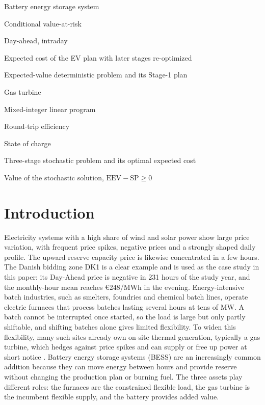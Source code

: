 \documentclass[5p,times,twocolumn]{elsarticle}
\newenvironment{nomlist}{%
  \begingroup\footnotesize
  \list{}{%
    \setlength{\labelwidth}{0.27\columnwidth}%
    \setlength{\labelsep}{4pt}%
    \setlength{\leftmargin}{\dimexpr\labelwidth+\labelsep\relax}%
    \setlength{\itemsep}{0.5pt}\setlength{\parsep}{0pt}%
    \setlength{\topsep}{1pt}\setlength{\partopsep}{0pt}%
    \renewcommand{\makelabel}[1]{##1\hfil}}%
}{\endlist\endgroup}
\newcommand{\nomheading}[1]{%
  \Needspace{4\baselineskip}%
  \par\vspace{3pt}\noindent{\footnotesize\bfseries\itshape #1}\par\vspace{1pt}}
\newcommand{\nomitem}[2]{\item[#1] #2}
\begin{document}
\nomheading{Abbreviations}
\begin{nomlist}
\nomitem{BESS}{Battery energy storage system}
\nomitem{CVaR}{Conditional value-at-risk}
\nomitem{DA, ID}{Day-ahead, intraday}
\nomitem{EEV}{Expected cost of the EV plan with later stages re-optimized}
\nomitem{EV}{Expected-value deterministic problem and its Stage-1 plan}
\nomitem{GT}{Gas turbine}
\nomitem{MILP}{Mixed-integer linear program}
\nomitem{RTE}{Round-trip efficiency}
\nomitem{SoC}{State of charge}
\nomitem{SP}{Three-stage stochastic problem and its optimal expected cost}
\nomitem{VSS}{Value of the stochastic solution, $\mathrm{EEV}-\mathrm{SP}\ge 0$}
\end{nomlist}


\section{Introduction}
Electricity systems with a high share of wind and solar power show large price variation, with frequent price spikes, negative prices and a strongly shaped daily profile. The upward reserve capacity price is likewise concentrated in a few hours. The Danish bidding zone DK1 is a clear example and is used as the case study in this paper: its Day-Ahead price is negative in 231 hours of the study year, and the monthly-hour mean reaches €248/MWh in the evening. Energy-intensive batch industries, such as smelters, foundries and chemical batch lines, operate electric furnaces that process batches lasting several hours at tens of MW. A batch cannot be interrupted once started, so the load is large but only partly shiftable, and shifting batches alone gives limited flexibility. To widen this flexibility, many such sites already own on-site thermal generation, typically a gas turbine, which hedges against price spikes and can supply or free up power at short notice \cite{Tan2019,Hadera2015}. Battery energy storage systems (BESS) are an increasingly common addition because they can move energy between hours and provide reserve without changing the production plan or burning fuel\cite{GwenaelleDeboutte,Shakrina2023}. The three assets play different roles: the furnaces are the constrained flexible load, the gas turbine is the incumbent flexible supply, and the battery provides added value. 
\end{document}
